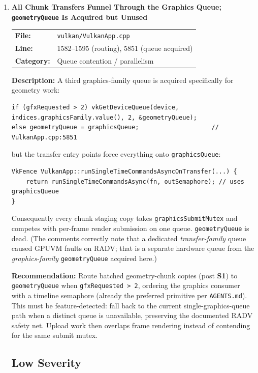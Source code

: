 \documentclass[a4paper,12pt]{article}
\newcommand{\severitybox}[2]{%
  \colorbox{#1}{\makebox[2.5cm][c]{\textcolor{white}{\textbf{#2}}}}%
}
\begin{document}
\begin{enumerate}[leftmargin=*]
\item[\textbf{[S5]}] \textbf{All Chunk Transfers Funnel Through the Graphics Queue; \texttt{geometryQueue} Is Acquired but Unused}
  \hfill \severitybox{mediumcolor}{MEDIUM}

  \begin{tabular}{ll}
    \textbf{File:} & \texttt{vulkan/VulkanApp.cpp} \\
    \textbf{Line:} & 1582--1595 (routing), 5851 (queue acquired) \\
    \textbf{Category:} & Queue contention / parallelism \\
  \end{tabular}

  \textbf{Description:}
  A third graphics-family queue is acquired specifically for geometry work:

\begin{lstlisting}
if (gfxRequested > 2) vkGetDeviceQueue(device, indices.graphicsFamily.value(), 2, &geometryQueue);
else geometryQueue = graphicsQueue;                    // VulkanApp.cpp:5851
\end{lstlisting}

  but the transfer entry points force everything onto \texttt{graphicsQueue}:

\begin{lstlisting}
VkFence VulkanApp::runSingleTimeCommandsAsyncOnTransfer(...) {
    return runSingleTimeCommandsAsync(fn, outSemaphore); // uses graphicsQueue
}
\end{lstlisting}

  Consequently every chunk staging copy takes \texttt{graphicsSubmitMutex} and
  competes with per-frame render submission on one queue. \texttt{geometryQueue}
  is dead. (The comments correctly note that a dedicated \emph{transfer-family}
  queue caused GPUVM faults on RADV; that is a separate hardware queue from the
  \emph{graphics-family} \texttt{geometryQueue} acquired here.)

  \textbf{Recommendation:}
  Route batched geometry-chunk copies (post \textbf{S1}) to \texttt{geometryQueue}
  when \texttt{gfxRequested > 2}, ordering the graphics consumer with a timeline
  semaphore (already the preferred primitive per \texttt{AGENTS.md}). This must
  be feature-detected: fall back to the current single-graphics-queue path when
  a distinct queue is unavailable, preserving the documented RADV safety net.
  Upload work then overlaps frame rendering instead of contending for the same
  submit mutex.

\subsection{Low Severity}


\end{enumerate}
\end{document}
